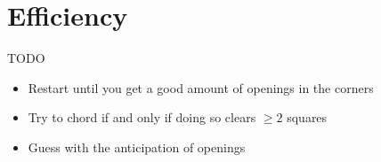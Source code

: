 \section{Efficiency}

\iffalse
While Chapter \ref{sec:efficiency} goes into a lot of detail on how to maximize efficiency, an efficiency player's goal is not always necessarily to maximize efficiency. Although this statement may seem contradictory, one will need to consider that maximizing efficiency drastically comes at the cost of winrate. Unless the objective really is to maximize efficiency completely abandoning all notions of a win rate, many players want a balance between efficiency and winrate.\\
\fi

TODO

\begin{itemize}
    \item Restart until you get a good amount of openings in the corners
    \item Try to chord if and only if doing so clears $\geq2$ squares
    \item Guess with the anticipation of openings
\end{itemize}